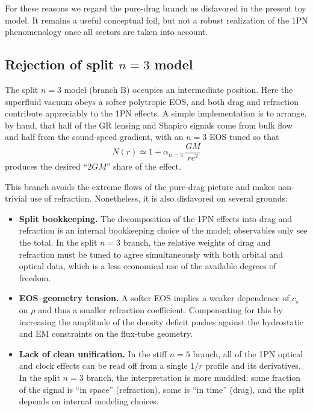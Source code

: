 \documentclass[11pt]{article}
\begin{document}
For these reasons we regard the pure-drag branch as disfavored in the
present toy model.
It remains a useful conceptual foil, but not a robust realization of the
1PN phenomenology once all sectors are taken into account.


\subsection{Rejection of split \texorpdfstring{$n=3$}{n=3} model}
\label{subsec:degeneracies-n3}

The split $n=3$ model (branch B) occupies an intermediate position.
Here the superfluid vacuum obeys a softer polytropic EOS, and both drag
and refraction contribute appreciably to the 1PN effects.
A simple implementation is to arrange, by hand, that half of the GR
lensing and Shapiro signals come from bulk flow and half from the
sound-speed gradient, with an $n=3$ EOS tuned so that
\[
  N(r) \simeq 1 + \alpha_{n=3}\,\frac{GM}{r c^2}
\]
produces the desired ``$2GM$'' share of the effect.

This branch avoids the extreme flows of the pure-drag picture and makes
non-trivial use of refraction.
Nonetheless, it is also disfavored on several grounds:

\begin{itemize}
  \item \textbf{Split bookkeeping.}
        The decomposition of the 1PN effects into drag and refraction is
        an internal bookkeeping choice of the model; observables only see
        the total.
        In the split $n=3$ branch, the relative weights of drag and
        refraction must be tuned to agree simultaneously with both
        orbital and optical data, which is a less economical use of the
        available degrees of freedom.

  \item \textbf{EOS–geometry tension.}
        A softer EOS implies a weaker dependence of $c_s$ on $\rho$ and
        thus a smaller refraction coefficient.
        Compensating for this by increasing the amplitude of the density
        deficit pushes against the hydrostatic and EM constraints on the
        flux-tube geometry.

  \item \textbf{Lack of clean unification.}
        In the stiff $n=5$ branch, all of the 1PN optical and clock
        effects can be read off from a single $1/r$ profile and its
        derivatives.
        In the split $n=3$ branch, the interpretation is more muddled:
        some fraction of the signal is ``in space'' (refraction), some is
        ``in time'' (drag), and the split depends on internal modeling
        choices.
\end{itemize}
\end{document}
